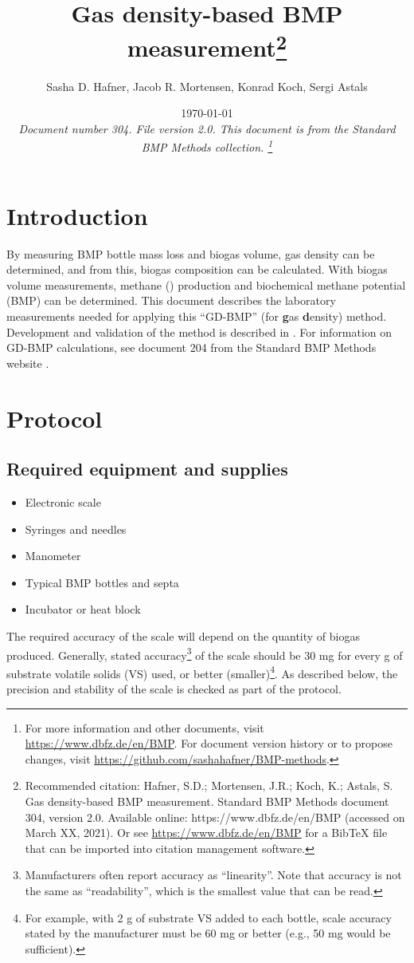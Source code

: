 \documentclass[]{article}
\title {Gas density-based BMP measurement\footnote{
  Recommended citation: 
Hafner, S.D.; Mortensen, J.R.; Koch, K.; Astals, S. Gas density-based BMP measurement. Standard BMP Methods document 304, version 2.0. Available online: https://www.dbfz.de/en/BMP (accessed on March XX, 2021).
\newline
  Or see \url{https://www.dbfz.de/en/BMP} for a BibTeX file that can be imported into citation management software.
}
}
\author{Sasha D. Hafner, Jacob R. Mortensen, Konrad Koch, Sergi Astals}
\date{\today \\
\bigskip
\textit{
  Document number 304.
  File version 2.0. 
  This document is from the Standard BMP Methods collection.
    \footnote{For more information and other documents, visit \url{https://www.dbfz.de/en/BMP}. 
    For document version history or to propose changes, visit \url{https://github.com/sashahafner/BMP-methods}.}
}
}
\begin{document}
\maketitle

\section{Introduction}
By measuring BMP bottle mass loss and biogas volume, gas density can be determined, and from this, biogas composition can be calculated.
With biogas volume measurements, methane () production and biochemical methane potential (BMP) can be determined.
This document describes the laboratory measurements needed for applying this ``GD-BMP'' (for \textbf{g}as \textbf{d}ensity) method.
Development and validation of the method is described in \citet{justesenDevelopmentValidationLowcost2019}.
For information on GD-BMP calculations, see document 204 from the Standard BMP Methods website \citep{BMPdoc204gasdens}. 

\section{Protocol}

\subsection{Required equipment and supplies}

\begin{itemize}
    \item Electronic scale
    \item Syringes and needles
    \item Manometer
    \item Typical BMP bottles and septa
    \item Incubator or heat block
\end{itemize}

The required accuracy of the scale will depend on the quantity of biogas produced. 
Generally, stated accuracy\footnote{
  Manufacturers often report accuracy as ``linearity''. 
  Note that accuracy is not the same as ``readability'', which is the smallest value that can be read. 
} of the scale should be 30 mg for every g of substrate volatile solids (VS) used, or better (smaller)\footnote{
  For example, with 2 g of substrate VS added to each bottle, scale accuracy stated by the manufacturer must be 60 mg or better (e.g., 50 mg would be sufficient).
}.
As described below, the precision and stability of the scale is checked as part of the protocol.
\end{document}
